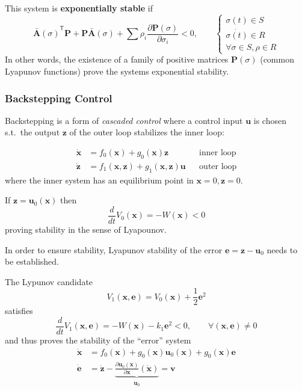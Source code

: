 This system is \textbf{exponentially stable} if
\noindent\begin{equation*}
    {\bar{\mathbf{A}}(\sigma)}^{\mathsf{T}} \mathbf{P} + \mathbf{P}\bar{\mathbf{A}}(\sigma) + \sum \rho_i \frac{\partial \mathbf{P}(\sigma)}{\partial \sigma_i} < 0,\qquad
    \begin{cases}
        \sigma(t)\in S       \\
        \dot{\sigma(t)}\in R \\
        \forall \sigma\in S, \rho\in R
    \end{cases}
\end{equation*}
In other words, the existence of a family of positive matrices $\mathbf{P}(\sigma)$ (common Lyapunov functions) prove the systems exponential stability.

\subsubsection{Backstepping Control}
Backstepping is a form of \textit{cascaded control} where a control input $\mathbf{u}$ is chosen s.t.\ the output $\mathbf{z}$ of the outer loop stabilizes the inner loop:

\noindent\begin{align*}
    \dot{\mathbf{x}} & = f_0(\mathbf{x}) + g_0(\mathbf{x})\mathbf{z}                         &  & \text{inner loop} \\
    \dot{\mathbf{z}} & = f_1(\mathbf{x},\mathbf{z}) + g_1(\mathbf{x}, \mathbf{z}) \mathbf{u} &  & \text{outer loop}
\end{align*}
where the inner system has an equilibrium point in $\mathbf{x}=0, \mathbf{z}=0$.

\newpar{}
If $\mathbf{z} = \mathbf{u}_0(\mathbf{x})$ then 
\noindent\begin{equation*}
    \frac{d}{dt} V_0(\mathbf{x}) = -W(\mathbf{x}) < 0
\end{equation*}
proving stability in the sense of Lyapounov.

\newpar{}

In order to ensure stability, Lyapunov stability of the error $\mathbf{e} = \mathbf{z}-\mathbf{u}_0$ needs to be established.

The Lypunov candidate
\noindent\begin{equation*}
    V_1(\mathbf{x}, \mathbf{e}) = V_0(\mathbf{x})+\frac{1}{2} \mathbf{e}^2
\end{equation*}
satisfies
\noindent\begin{equation*}
    \frac{d}{dt}V_1(\mathbf{x}, \mathbf{e}) = -W(\mathbf{x}) - k_1 \mathbf{e}^2 <0 ,\qquad \forall(\mathbf{x},\mathbf{e}) \neq 0
\end{equation*}
and thus proves the stability of the ``error'' system
\noindent\begin{align*}
    \dot{\mathbf{x}} &= f_0(\mathbf{x})+g_0(\mathbf{x})\mathbf{u}_0(\mathbf{x}) + g_0(\mathbf{x})\mathbf{e}\\
    \dot{\mathbf{e}} &= \dot{\mathbf{z}} - \underbrace{\frac{\partial \mathbf{u}_0(\mathbf{x})}{\partial \mathbf{x}}(\dot{\mathbf{x}})}_{\dot{\mathbf{u}}_0} = \mathbf{v}
\end{align*}